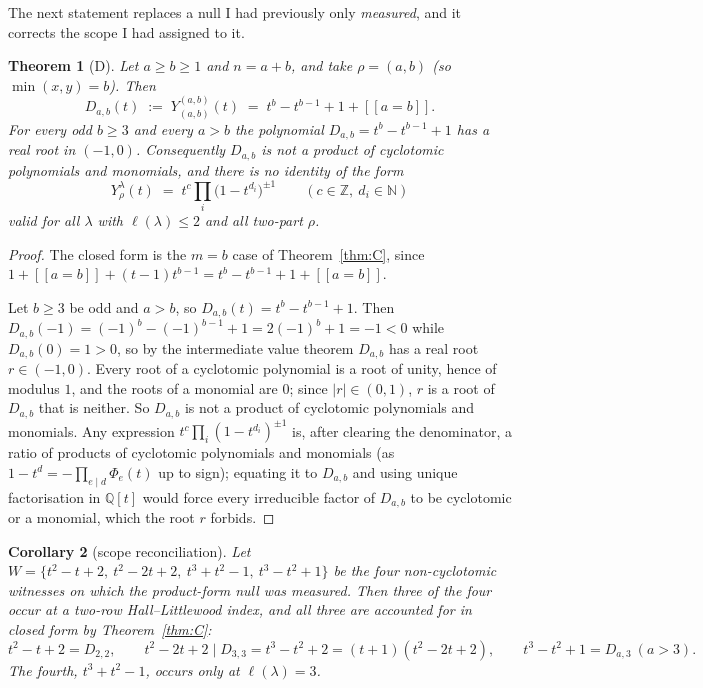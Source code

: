 \documentclass[11pt]{article}
\theoremstyle{plain}
\newtheorem{theorem}{Theorem}
\newtheorem{corollary}[theorem]{Corollary}
\theoremstyle{definition}
\newcommand{\QQ}{\mathbb{Q}}
\newcommand{\ZZ}{\mathbb{Z}}
\newcommand{\NN}{\mathbb{N}}
\newcommand{\lam}{\lambda}
\newcommand{\lb}{[\![}
\newcommand{\rb}{]\!]}
\begin{document}
The next statement replaces a null I had previously only \emph{measured}, and it corrects the
scope I had assigned to it.

\begin{theorem}[D]\label{thm:D}
Let $a\ge b\ge 1$ and $n=a+b$, and take $\rho=(a,b)$ (so $\min(x,y)=b$). Then
\[
  D_{a,b}(t)\;:=\;Y^{(a,b)}_{(a,b)}(t)\;=\;t^{b}-t^{b-1}+1+\lb a=b\rb .
\]
For every odd $b\ge 3$ and every $a>b$ the polynomial $D_{a,b}=t^b-t^{b-1}+1$ has a real root in
$(-1,0)$. Consequently $D_{a,b}$ is not a product of cyclotomic polynomials and monomials, and
there is no identity of the form
\[
  Y^{\lam}_{\rho}(t)\;=\;t^{c}\prod_{i}\bigl(1-t^{d_i}\bigr)^{\pm 1}
  \qquad (c\in\ZZ,\ d_i\in\NN)
\]
valid for all $\lam$ with $\ell(\lam)\le 2$ and all two-part $\rho$.
\end{theorem}

\begin{proof}
The closed form is the $m=b$ case of Theorem~\ref{thm:C}, since
$1+\lb a=b\rb+(t-1)t^{b-1}=t^{b}-t^{b-1}+1+\lb a=b\rb$.

Let $b\ge 3$ be odd and $a>b$, so $D_{a,b}(t)=t^b-t^{b-1}+1$. Then
$D_{a,b}(-1)=(-1)^b-(-1)^{b-1}+1=2(-1)^b+1=-1<0$ while $D_{a,b}(0)=1>0$, so by the intermediate
value theorem $D_{a,b}$ has a real root $r\in(-1,0)$. Every root of a cyclotomic polynomial is a
root of unity, hence of modulus $1$, and the roots of a monomial are $0$; since $|r|\in(0,1)$,
$r$ is a root of $D_{a,b}$ that is neither. So $D_{a,b}$ is not a product of cyclotomic
polynomials and monomials. Any expression $t^{c}\prod_i(1-t^{d_i})^{\pm 1}$ is, after clearing
the denominator, a ratio of products of cyclotomic polynomials and monomials (as
$1-t^{d}=-\prod_{e\mid d}\Phi_e(t)$ up to sign); equating it to $D_{a,b}$ and using unique
factorisation in $\QQ[t]$ would force every irreducible factor of $D_{a,b}$ to be cyclotomic or
a monomial, which the root $r$ forbids.
\end{proof}

\begin{corollary}[scope reconciliation]\label{cor:scope}
Let $W=\{t^2-t+2,\ t^2-2t+2,\ t^3+t^2-1,\ t^3-t^2+1\}$ be the four non-cyclotomic witnesses on
which the product-form null was measured. Then three of the four occur at a \emph{two-row}
Hall--Littlewood index, and all three are accounted for in closed form by
Theorem~\ref{thm:C}:
\[
  t^2-t+2=D_{2,2},\qquad
  t^2-2t+2 \mid D_{3,3}=t^3-t^2+2=(t+1)(t^2-2t+2),\qquad
  t^3-t^2+1=D_{a,3}\ (a>3).
\]
The fourth, $t^3+t^2-1$, occurs only at $\ell(\lam)=3$.
\end{corollary}
\end{document}
